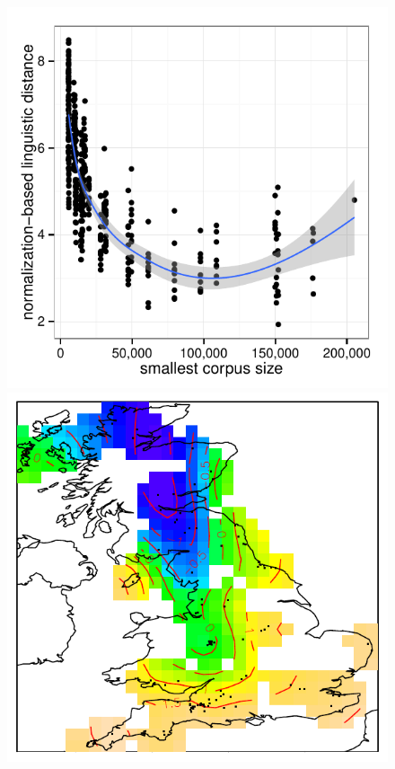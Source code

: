 \documentclass[output=paper]{LSP/langsci}
\begin{document}
\begin{figure}[tbp]
\begin{minipage}[b]{0.45\linewidth} %
    \centering
    \vfill
    \includegraphics [keepaspectratio,width=.98 \textwidth] {illustrations/wolk_min-norm.pdf}
    \vfill
\end{minipage}
\hspace{0.5cm} %
\begin{minipage}[b]{0.45\linewidth}
    \centering
    \includegraphics [keepaspectratio,width=.98\textwidth] {illustrations/wolk_multneg-gam.pdf}

\end{minipage}
\end{figure}
\end{document}
